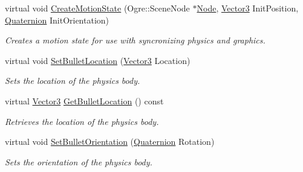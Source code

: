 \begin{DoxyCompactItemize}
virtual void \hyperlink{classphys_1_1ActorBase_ae002dd16cd0d7d2c3d3098f85920ae02}{CreateMotionState} (Ogre::SceneNode $\ast$\hyperlink{classphys_1_1Node}{Node}, \hyperlink{classphys_1_1Vector3}{Vector3} InitPosition, \hyperlink{classphys_1_1Quaternion}{Quaternion} InitOrientation)
\begin{DoxyCompactList}\small\item\em Creates a motion state for use with syncronizing physics and graphics. \item\end{DoxyCompactList}\item 
virtual void \hyperlink{classphys_1_1ActorBase_aa7ab524d2905e640cea6324cce9ccfdb}{SetBulletLocation} (\hyperlink{classphys_1_1Vector3}{Vector3} Location)
\begin{DoxyCompactList}\small\item\em Sets the location of the physics body. \item\end{DoxyCompactList}\item 
virtual \hyperlink{classphys_1_1Vector3}{Vector3} \hyperlink{classphys_1_1ActorBase_a9b32df1efdc346f5d6c0920b959c09a3}{GetBulletLocation} () const 
\begin{DoxyCompactList}\small\item\em Retrieves the location of the physics body. \item\end{DoxyCompactList}\item 
virtual void \hyperlink{classphys_1_1ActorBase_a492244ac46ced53b809f436da992bc84}{SetBulletOrientation} (\hyperlink{classphys_1_1Quaternion}{Quaternion} Rotation)
\begin{DoxyCompactList}\small\item\em Sets the orientation of the physics body. \item\end{DoxyCompactList}\end{DoxyCompactItemize}
